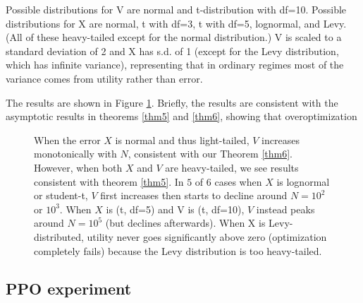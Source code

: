 \documentclass{article}
\begin{document}
Possible distributions for V are normal and t-distribution with df=10.
Possible distributions for X are normal, t with df=3, t with df=5, lognormal, and Levy. (All of these heavy-tailed except for the normal distribution.)
V is scaled to a standard deviation of 2 and X has s.d. of 1 (except for the Levy distribution, which has infinite variance), representing that in ordinary regimes most of the variance comes from utility rather than error.

The results are shown in Figure \ref{fig:best-of-n}. Briefly, the results are consistent with the asymptotic results in theorems \ref{thm5} and \ref{thm6}, showing that overoptimization

\begin{figure}
    \centering
    \caption{When the error $X$ is normal and thus light-tailed, $V$ increases monotonically with $N$, consistent with our Theorem \ref{thm6}. \\
    However, when both $X$ and $V$ are heavy-tailed, we see results consistent with theorem \ref{thm5}. In $5$ of $6$ cases when $X$ is lognormal or student-t, $V$ first increases then starts to decline around $N=10^2$ or $10^3$. When $X$ is (t, df=5) and V is (t, df=10), $V$ instead peaks around $N=10^5$ (but declines afterwards). When X is Levy-distributed, utility never goes significantly above zero (optimization completely fails) because the Levy distribution is too heavy-tailed.}
    \label{fig:best-of-n}
\end{figure}

\subsection{PPO experiment}
\end{document}

